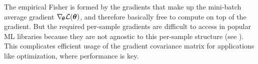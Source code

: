 The empirical Fisher is formed by the gradients that make up the mini-batch
average gradient $\nabla_{\!{{\bm{\theta}}}}{\mathcal{L}}({\bm{\theta}})$, and therefore basically free to
compute on top of the gradient. But the required per-sample gradients are
difficult to access in popular ML libraries because they are not agnostic to
this per-sample structure (see
). This complicates
efficient usage of the gradient covariance matrix for applications like
optimization, where performance is key.

